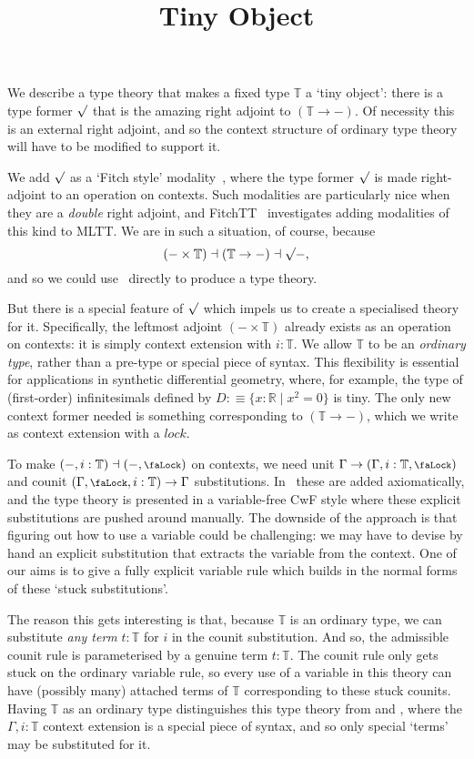 \documentclass[10pt]{article}
\title{Tiny Object}
\author{}
\date{}
\theoremstyle{definition}
\let\oldequiv\equiv%
\renewcommand{\equiv}{\simeq}
\newcommand{\defeq}{\oldequiv}
\newcommand{\lock}{\mathchoice {\scalebox{0.8}{\text{\faLock}}}
  {\scalebox{0.8}{\text{\faLock}}} {\scalebox{0.5}{\text{\faLock}}}
  {\scalebox{0.4}{\text{\faLock}}} }
\newcommand{\Tiny}{\mathbb{T}}
\newcommand{\rformsym}{\surd}
\newcommand{\rformu}[1]{\ThisStyle{\raisebox{0.07em}{$\SavedStyle \rformsym$}} #1}
\begin{document}
\maketitle

We describe a type theory that makes a fixed type $\Tiny$ a `tiny
object': there is a type former $\rformu$ that is the amazing right
adjoint to $(\Tiny \to -)$. Of necessity this is an external right
adjoint, and so the context structure of ordinary type theory will
have to be modified to support it.

We add $\rformu$ as a `Fitch style'
modality~\cite{clouston:fitch-style}, where the type former $\rformu$
is made right-adjoint to an operation on contexts. Such modalities are
particularly nice when they are a \emph{double} right adjoint, and
FitchTT~\cite{fitchtt} investigates adding modalities of this kind to
MLTT. We are in such a situation, of course, because
\[{(- \times \Tiny) \dashv (\Tiny \to -) \dashv \rformu -},\] and so
we could use~\cite{fitchtt} directly to produce a type theory.

But there is a special feature of $\rformu$ which impels us to create
a specialised theory for it. Specifically, the leftmost adjoint
$(- \times \Tiny)$ already exists as an operation on contexts: it is
simply context extension with $i : \Tiny$. We allow $\Tiny$ to be an
\emph{ordinary type}, rather than a pre-type or special piece of
syntax. This flexibility is essential for applications in synthetic
differential geometry, where, for example, the type of (first-order)
infinitesimals defined by
$D :\defeq \{ x : \mathbb{R} \mid x^2 = 0 \}$ is tiny. The only new
context former needed is something corresponding to $(\Tiny \to -)$,
which we write as context extension with a $lock$.

To make $(-,i:\Tiny) \dashv (-,\lock)$ on contexts, we need unit
$\Gamma \to (\Gamma,i : \Tiny, \lock)$ and counit
$(\Gamma,\lock,i : \Tiny) \to \Gamma$ substitutions. In~\cite{fitchtt}
these are added axiomatically, and the type theory is presented in a
variable-free CwF style where these explicit substitutions are pushed
around manually. The downside of the approach is that figuring out how
to use a variable could be challenging: we may have to devise by hand
an explicit substitution that extracts the variable from the context.
One of our aims is to give a fully explicit variable rule which
builds in the normal forms of these `stuck substitutions'.

The reason this gets interesting is that, because $\Tiny$ is an
ordinary type, we can substitute \emph{any term} $t : \Tiny$ for $i$
in the counit substitution. And so, the admissible counit rule is
parameterised by a genuine term $t : \Tiny$. The counit rule only gets
stuck on the ordinary variable rule, so every use of a variable in
this theory can have (possibly many) attached terms of $\Tiny$
corresponding to these stuck counits. Having $\Tiny$ as an ordinary
type distinguishes this type theory from
\cite{cavallo-harper:parametricity-for-ctt,cavallo:thesis} and
\cite[Section 5]{fitchtt}, where the $\Gamma,i:\Tiny$ context
extension is a special piece of syntax, and so only special `terms'
may be substituted for it.
\end{document}
